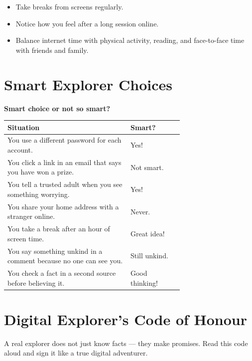 \begin{itemize}
  \item Take breaks from screens regularly.
  \item Notice how you feel after a long session online.
  \item Balance internet time with physical activity, reading, and face-to-face time with friends and family.
\end{itemize}

\sectionrule

\section*{Smart Explorer Choices}

\begin{quickmap}
  \textbf{Smart choice or not so smart?}
  \begin{center}
    \begin{tabular}{p{0.7\linewidth}l}
      \textbf{Situation} & \textbf{Smart?} \\
      \hline
      You use a different password for each account. & Yes! \\
      You click a link in an email that says you have won a prize. & Not smart. \\
      You tell a trusted adult when you see something worrying. & Yes! \\
      You share your home address with a stranger online. & Never. \\
      You take a break after an hour of screen time. & Great idea! \\
      You say something unkind in a comment because no one can see you. & Still unkind. \\
      You check a fact in a second source before believing it. & Good thinking! \\
    \end{tabular}
  \end{center}
\end{quickmap}

\sectionrule

\section*{Digital Explorer's Code of Honour}

\begin{picturethis}
  A real explorer does not just know facts — they make promises.
  Read this code aloud and sign it like a true digital adventurer.
\end{picturethis}

